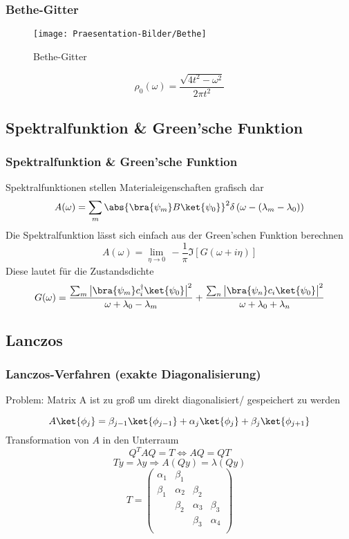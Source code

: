 \documentclass{beamer}
\begin{document}
\begin{frame}
\frametitle{Bethe-Gitter}
\begin{figure}
	\centering
	\texttt{[image: Praesentation-Bilder/Bethe]}
	\caption{Bethe-Gitter \cite{Wikipedia}}
	\label{fig:bethe}
\end{figure}
\[ \rho_0(\omega) = \frac{\sqrt{4t^2-\omega^2}}{2\pi t^2} \]
\end{frame}

\subsection[Spektralfunktion \&\\Green'sche Funktion]{Spektralfunktion \& Green'sche Funktion}
\begin{frame}
\frametitle{Spektralfunktion \& Green'sche Funktion}
Spektralfunktionen stellen Materialeigenschaften grafisch dar
\[ A(\omega) =\sum_{m}\abs{\bra{\psi_m}B\ket{\psi_0}}^2\delta\left( \omega-(\lambda_m-\lambda_0)\right) \]
Die Spektralfunktion lässt sich einfach aus der Green'schen Funktion berechnen
\[ A(\omega)= \lim\limits_{\eta \rightarrow 0}\,-\frac{1}{\pi}\Im\left[ G(\omega+i\eta)\right]  \]
Diese lautet für die Zustandsdichte
\[ G(\omega) = \frac{\sum_{m}\big| \bra{\psi_m}c^\dagger_i\ket{\psi_0}\big| ^2}{\omega +\lambda_0 -\lambda_m }  + \frac{\sum_{n}\big| \bra{\psi_n}c_i\ket{\psi_0}\big| ^2}{\omega + \lambda_0 +\lambda_n} \]
\end{frame}

\subsection{Lanczos}
\begin{frame}
\frametitle{Lanczos-Verfahren (exakte Diagonalisierung)}
\begin{block}{Problem:}
Matrix A ist zu groß um direkt diagonalisiert/ gespeichert zu werden
\end{block}\pause
\[ A\ket{\phi_j} = \beta_{j-1}\ket{\phi_{j-1}}+\alpha_j\ket{\phi_j}+\beta_{j}\ket{\phi_{j+1}} \]
Transformation von $ A $ in den Unterraum
\[ Q^TAQ = T \Leftrightarrow AQ = QT \]
\[ Ty=\lambda y \Rightarrow A(Qy)=\lambda(Qy) \]
\[ T = \left( {\begin{array}{cccc}
	\alpha_1 & \beta_1 & & \\
	\beta_1  &\alpha_2 & \beta_2 & \\
	& \beta_2 & \alpha_3 & \beta_3\\
	& &\beta_3 &\alpha_4\\
	\end{array}}\right)  \]
\end{frame}
\end{document}

